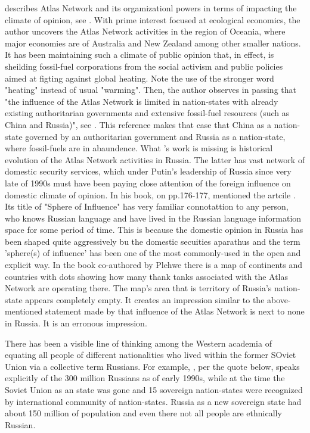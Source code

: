 \citeauthor{walker2020} describes Atlas Network and its orgamizationl powers in terms of impacting the climate of opinion, see \citep[pp.~173-179]{walker2020}. With prime interest focused at ecological economics, the author uncovers the Atlas Network activities in the region of Oceania, where major economies are of Australia and New Zealand among other smaller nations. It has been maintaining such a climate of public opinion that, in effect, is sheilding fossil-fuel corporations from the social activism and public policies aimed at figting against global heating. Note the use of the stronger word "heating" instead of usual "warming". Then, the author observes in passing that "the influence of the Atlas Network is limited in nation-states with already existing authoritarian governments and extensive fossil-fuel resources (such as China and Russia)", see \citep[p.~178]{walker2020}. This reference makes that case that China as a nation-state governed by an authoritarian government and Russia as a nation-state, where fossil-fuels are in abaundence. What \citeauthor{walker2020}'s work is missing is historical evolution of the Atlas Network activities in Russia. The latter has vast network of domestic security services, which under Putin's leadership of Russia since very late of 1990s must have been paying close attention of the foreign influence on domestic climate of opinion. In his book, on pp.176-177, \citeauthor{walker2020} mentioned the artcile \citep{fang2017}. Its title of "Sphere of Influence" has very familiar connotattion to any person, who knows Russian language and have lived in the Russian language information space for some period of time. This is because the domestic opinion in Russia has been shaped quite aggressively bu the domestic secuities aparathus and the term 'sphere(s) of influence' has been one of the most commonly-used in the open and explicit way. In the book co-authored by Plehwe there is a map of continents and countries with dots showing how many thank tanks associated with the Atlas Network are operating there. The map's area that is territory of Russia's nation-state appears completely empty. It creates an impression similar to the above-mentioned statement made by \citeauthor{walker2020} that influence of the Atlas Network is next to none in Russia. It is an erronous impression.

There has been a visible line of thinking among the Western academia of equating all people of different nationalities who lived within the former SOviet Union via a collective term Russians. For example, \citeauthor{buck-morss1995}, per the quote below, speaks explicitly of the 300 million Russians as of early 1990s, while at the time the Soviet Union as an state was gone and 15 sovereign nation-states were recognized by international community of nation-states. Russia as a new sovereign state had about 150 million of population and even there not all people are ethnically Russian. 

